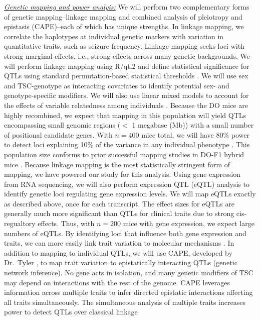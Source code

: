 \documentclass[
  12pt,
]{article}
\begin{document}
\textit{\underline{Genetic mapping and power analyis:}} We will perform
two complementary forms of genetic mapping--linkage mapping and combined
analysis of pleiotropy and epistasis (CAPE)--each of which has unique
strengths. In linkage mapping, we correlate the haplotypes at individual
genetic markers with variation in quantitative traits, such as seizure
frequency. Linkage mapping seeks loci with strong marginal effects,
i.e., strong effects across many genetic backgrounds. We will perform
linkage mapping using R/qtl2 \cite{30591514} and define statistical
significance for QTLs using standard permutation-based statistical
thresholds \cite{8770605}. We will use sex and TSC-genotype as
interacting covariates to identify potential sex- and genotype-specific
modifiers. We will also use linear mixed models to account for the
effects of variable relatedness among individuals \cite{18385116}.
Because the DO mice are highly recombined, we expect that mapping in
this population will yield QTLs encompassing small genomic regions
(\(<\) 1 megabase (Mb)) with a small number of positional candidate
genes. With \(n = 400\) mice total, we will have 80\% power to detect
loci explaining 10\% of the variance in any individual phenotype
\cite{25237114}. This population size conforms to prior successful
mapping studies in DO-F1 hybrid mice \cite{27916600}. Because linkage
mapping is the most statistically stringent form of mapping, we have
powered our study for this analysis. Using gene expression from RNA
sequencing, we will also perform expression QTL (eQTL) analysis to
identify genetic loci regulating gene expression levels. We will map
eQTLs exactly as described above, once for each transcript. The effect
sizes for eQTLs are generally much more significant than QTLs for
clinical traits due to strong cis-regualtory effects. Thus, with
\(n=200\) mice with gene expression, we expect large numbers of eQTLs.
By identifying loci that influence both gene expression and traits, we
can more easily link trait variation to molecular mechanisms
\cite{29567659}. In addition to mapping to individual QTLs, we will use
CAPE, developed by Dr.~Tyler \cite{24204223}, to map trait variation to
epistatically interacting QTLs (genetic network inference). No gene acts
in isolation, and many genetic modifiers of TSC may depend on
interactions with the rest of the genome. CAPE leverages information
across multiple traits to infer directed epistatic interactions
affecting all traits simultaneously. The simultaneous analysis of
multiple traits increases power to detect QTLs over classical linkage
\end{document}
